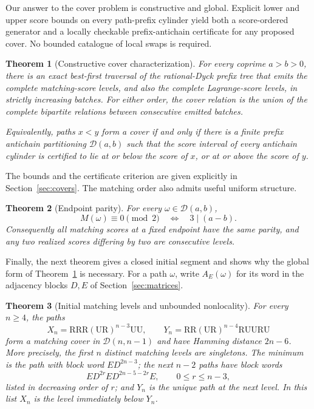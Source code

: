 \documentclass[11pt]{amsart}
\newtheorem{theorem}{Theorem}[section]
\theoremstyle{definition}
\newcommand{\RR}{\mathrm{R}}
\newcommand{\UU}{\mathrm{U}}
\newcommand{\cD}{\mathcal D}
\begin{document}
Our answer to the cover problem is constructive and global.  Explicit lower
and upper score bounds on every path-prefix cylinder yield both a score-ordered
generator and a locally checkable prefix-antichain certificate for any
proposed cover.  No bounded catalogue of local swaps is required.

\begin{theorem}[Constructive cover characterization]\label{thm:global-cover}
For every coprime $a>b>0$, there is an exact best-first traversal of the
rational-Dyck prefix tree that emits the complete matching-score levels, and
also the complete Lagrange-score levels, in strictly increasing batches.
For either order, the cover relation is the union of the complete bipartite
relations between consecutive emitted batches.

Equivalently, paths $x<y$ form a cover if and only if there is a finite prefix
antichain partitioning $\cD(a,b)$ such that the score interval of every
antichain cylinder is certified to lie at or below the score of $x$, or at or
above the score of $y$.
\end{theorem}

The bounds and the certificate criterion are given explicitly in
Section~\ref{sec:covers}.  The matching order also admits useful uniform
structure.

\begin{theorem}[Endpoint parity]\label{thm:parity}
For every $\omega\in\cD(a,b)$,
\[
 M(\omega)\equiv0\pmod2
 \quad\Longleftrightarrow\quad
 3\mid(a-b).
\]
Consequently all matching scores at a fixed endpoint have the same parity,
and any two realized scores differing by two are consecutive levels.
\end{theorem}

Finally, the next theorem gives a closed initial segment and shows why the
global form of Theorem~\ref{thm:global-cover} is necessary.  For a path
$\omega$, write $A_E(\omega)$ for its word in the adjacency blocks $D,E$ of
Section~\ref{sec:matrices}.

\begin{theorem}[Initial matching levels and unbounded nonlocality]
\label{thm:nonlocal}
For every $n\geq4$, the paths
\[
 X_n=\RR\RR\RR(\UU\RR)^{n-3}\UU\UU,
 \qquad
 Y_n=\RR\RR(\UU\RR)^{n-4}\RR\UU\UU\RR\UU
\]
form a matching cover in $\cD(n,n-1)$ and have Hamming distance $2n-6$.
More precisely, the first $n$ distinct matching levels are singletons.  The
minimum is the path with block word $ED^{2n-3}$; the next $n-2$ paths have
block words
\[
 ED^{2r}ED^{2n-5-2r}E,
 \qquad 0\leq r\leq n-3,
\]
listed in decreasing order of $r$; and $Y_n$ is the unique path at the next
level.  In this list $X_n$ is the level immediately below $Y_n$.
\end{theorem}
\end{document}
